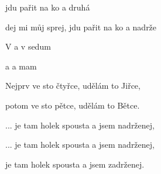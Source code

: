 

\zr
   jdu pařit na ko
    a  druhá 
	
  dej mi můj sprej, jdu pařit na ko
    a  nadrže
\kr

\zs
  V   a v  sedum 

  a   a  mam 
\ks

\zr \kr
	
\zs
Nejprv ve sto čtyřce, udělám to Jiřce,

potom ve sto pětce, udělám to Bětce.
\ks

\zr

	...	je tam holek spousta a jsem nadrženej,

	...	je tam holek spousta a jsem nadrženej,

	je tam holek spousta a jsem zadrženej.
\kr

\kp
